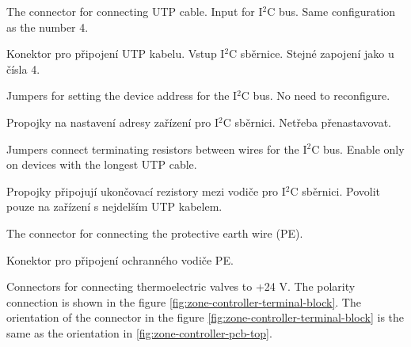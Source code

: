 \newpage
\begin{English}
The connector for connecting UTP cable. Input for I$^2$C bus. Same configuration as the number 4.
\end{English}

\begin{Czech}
Konektor pro připojení UTP kabelu. Vstup I$^2$C sběrnice. Stejné zapojení jako u čísla 4.
\end{Czech}


\begin{English}
Jumpers for setting the device address for the I$^2$C bus. No need to reconfigure.
\end{English}

\begin{Czech}
Propojky na nastavení adresy zařízení pro I$^2$C sběrnici. Netřeba přenastavovat.
\end{Czech}


\begin{English}
Jumpers connect terminating resistors between wires for the I$^2$C bus. Enable only on devices with the longest UTP cable.
\end{English}

\begin{Czech}
Propojky připojují ukončovací rezistory mezi vodiče pro I$^2$C sběrnici. Povolit pouze na zařízení s nejdelším UTP kabelem.
\end{Czech}


\begin{English}
The connector for connecting the protective earth wire (PE).
\end{English}

\begin{Czech}
Konektor pro připojení ochranného vodiče PE.
\end{Czech}


\begin{English}
Connectors for connecting thermoelectric valves to +24 V. The polarity connection is shown in the figure \ref{fig:zone-controller-terminal-block}. The orientation of the connector in the figure \ref{fig:zone-controller-terminal-block} is the same as the orientation in \ref{fig:zone-controller-pcb-top}.
\end{English}


